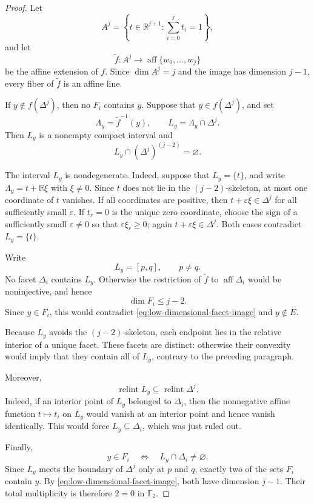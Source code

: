 \documentclass[reqno,12pt]{amsart}
\theoremstyle{definition}
\newcommand{\F}{\mathbb F_2}
\begin{document}
\begin{proof}
Let
\[
 A^j=\left\{t\in\mathbb R^{j+1}:\sum_{i=0}^j t_i=1\right\},
\]
and let
\[
 \widetilde f:A^j\longrightarrow
 \operatorname{aff}\{w_0,\ldots,w_j\}
\]
be the affine extension of \(f\).  Since
\(\dim A^j=j\) and the image has dimension \(j-1\), every fiber of
\(\widetilde f\) is an affine line.

If \(y\notin f(\Delta^j)\), then no \(F_i\) contains \(y\).  Suppose
that \(y\in f(\Delta^j)\), and set
\[
 \Lambda_y=\widetilde f^{-1}(y),
 \qquad
 L_y=\Lambda_y\cap\Delta^j.
\]
Then \(L_y\) is a nonempty compact interval and
\[
 L_y\cap(\Delta^j)^{(j-2)}=\varnothing.
\]

The interval \(L_y\) is nondegenerate.  Indeed, suppose that
\(L_y=\{t\}\), and write
\(\Lambda_y=t+\mathbb R\xi\) with \(\xi\ne0\).
Since \(t\) does not lie in the \((j-2)\)-skeleton, at most one
coordinate of \(t\) vanishes.  If all coordinates are positive, then
\(t+\varepsilon\xi\in\Delta^j\) for all sufficiently small
\(\varepsilon\).  If \(t_r=0\) is the unique zero coordinate, choose
the sign of a sufficiently small \(\varepsilon\ne0\) so that
\(\varepsilon\xi_r\geq0\); again
\(t+\varepsilon\xi\in\Delta^j\).  Both cases contradict
\(L_y=\{t\}\).

Write
\[
 L_y=[p,q],
 \qquad p\ne q.
\]
No facet \(\Delta_i\) contains \(L_y\).  Otherwise the restriction of
\(\widetilde f\) to \(\operatorname{aff}\Delta_i\) would be
noninjective, and hence
\[
 \dim F_i\leq j-2.
\]
Since \(y\in F_i\), this would contradict
\eqref{eq:low-dimensional-facet-image} and \(y\notin E\).

Because \(L_y\) avoids the \((j-2)\)-skeleton, each endpoint lies in
the relative interior of a unique facet.  These facets are distinct:
otherwise their convexity would imply that they contain all of
\(L_y\), contrary to the preceding paragraph.

Moreover,
\[
 \operatorname{relint}L_y\subseteq\operatorname{relint}\Delta^j.
\]
Indeed, if an interior point of \(L_y\) belonged to \(\Delta_i\), then
the nonnegative affine function \(t\mapsto t_i\) on \(L_y\) would
vanish at an interior point and hence vanish identically.  This would
force \(L_y\subseteq\Delta_i\), which was just ruled out.

Finally,
\[
 y\in F_i
 \quad\Longleftrightarrow\quad
 L_y\cap\Delta_i\ne\varnothing.
\]
Since \(L_y\) meets the boundary of \(\Delta^j\) only at \(p\) and
\(q\), exactly two of the sets \(F_i\) contain \(y\).  By
\eqref{eq:low-dimensional-facet-image}, both have dimension \(j-1\).
Their total multiplicity is therefore \(2=0\) in \(\F\).
\end{proof}
\end{document}
